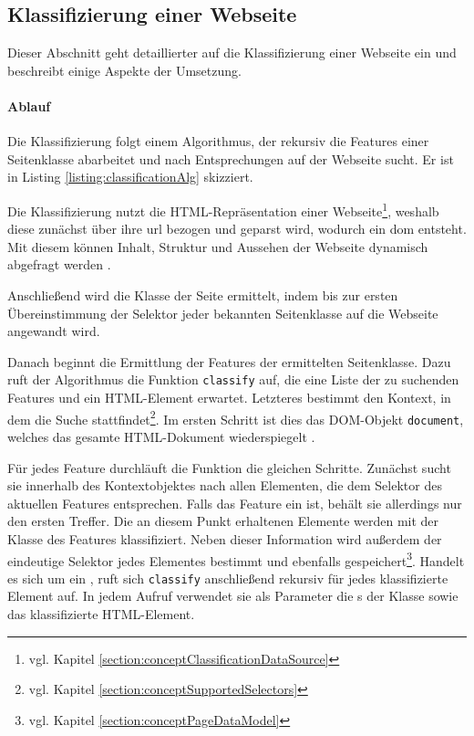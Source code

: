 \subsection{Klassifizierung einer Webseite}
    \label{section:solutionDetailsClassificationServiceClassification}
    Dieser Abschnitt geht detaillierter auf die Klassifizierung einer Webseite ein
    und beschreibt einige Aspekte der Umsetzung.

    \paragraph{Ablauf}
    Die Klassifizierung folgt einem Algorithmus,
    der rekursiv die Features einer Seitenklasse abarbeitet und nach Entsprechungen
    auf der Webseite sucht.
    Er ist in Listing \ref{listing:classificationAlg} skizziert.

    

    Die Klassifizierung nutzt die HTML-Repräsentation einer
    Webseite\footnote{vgl. Kapitel \ref{section:conceptClassificationDataSource}},
    weshalb diese zunächst über ihre \gls{url} bezogen und geparst wird,
    wodurch ein \gls{dom} entsteht.
    Mit diesem können Inhalt, Struktur und Aussehen der Webseite
    dynamisch abgefragt werden \cite{w3c:dom}.

    Anschließend wird die Klasse der Seite ermittelt,
    indem bis zur ersten Übereinstimmung der Selektor jeder bekannten
    Seitenklasse auf die Webseite angewandt wird.

    Danach beginnt die Ermittlung der Features der ermittelten Seitenklasse.
    Dazu ruft der Algorithmus die Funktion \texttt{classify} auf,
    die eine Liste der zu suchenden Features und ein HTML-Element erwartet.
    Letzteres bestimmt den Kontext, in dem die Suche stattfindet\footnote{vgl. Kapitel \ref{section:conceptSupportedSelectors}}.
    Im ersten Schritt ist dies das DOM-Objekt \texttt{document},
    welches das gesamte HTML-Dokument wiederspiegelt \cite[Kapitel 1.4]{w3c:dom}.

    Für jedes Feature durchläuft die Funktion die gleichen Schritte.
    Zunächst sucht sie innerhalb des Kontextobjektes nach allen Elementen,
    die dem Selektor des aktuellen Features entsprechen.
    Falls das Feature ein {\scalarFeature} ist, behält sie allerdings nur den ersten Treffer.
    Die an diesem Punkt erhaltenen Elemente werden mit der Klasse des Features klassifiziert.
    Neben dieser Information wird außerdem der eindeutige Selektor jedes Elementes bestimmt
    und ebenfalls gespeichert\footnote{vgl. Kapitel \ref{section:conceptPageDataModel}}.
    Handelt es sich um ein {\collectionFeature}, ruft sich \texttt{classify} anschließend rekursiv für jedes klassifizierte Element auf.
    In jedem Aufruf verwendet sie als Parameter die {\childFeature}s der Klasse sowie das klassifizierte HTML-Element.

